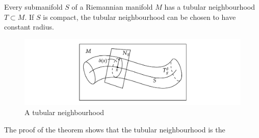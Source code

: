 \begin{thm} 
	Every submanifold $S$ of a Riemannian manifold $M$ has a 
	tubular neighbourhood  $T\subset M$. If $S$ is compact, the tubular
	neighbourhood can be chosen to have constant radius.
\end{thm}

\begin{figure}[htb]
	\hfill
	\begin{minipage}[c]{0.56\textwidth}
		\includegraphics[trim={4cm 3mm 4cm 3.7mm},clip,width=\textwidth]{figs/tubular_neighbourhood.pdf}
	\end{minipage} 
	\begin{minipage}[c]{0.3\textwidth}
        \caption{A tubular neighbourhood}
        \label{fig:tubular_neighbourhood}
	\end{minipage} 
\end{figure}
The proof of the theorem shows that the tubular neighbourhood is the
